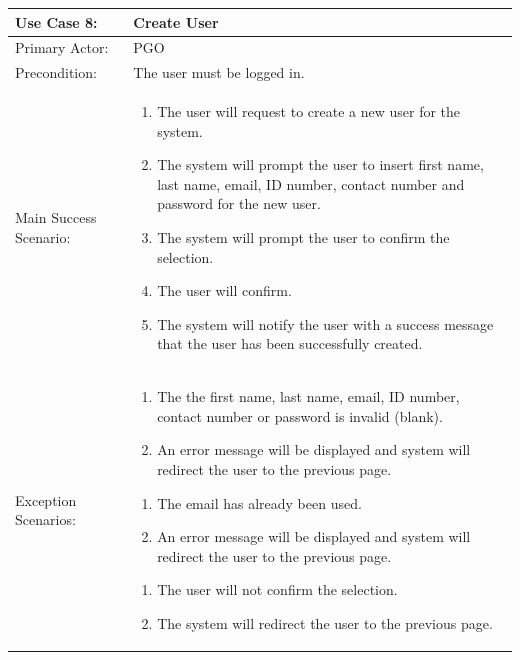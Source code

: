 \documentclass{article}
\begin{document}
\begin{tabular} {| m{5cm} | m{10cm} |}
\hline
Use Case 8: & Create User \\
\hline
Primary Actor: & PGO \\
\hline
Precondition: & The user must be logged in. \\
\hline
Main Success Scenario: & \begin{enumerate} \itemsep0em \item The user will request to create a new user for the system. 
\item The system will prompt the user to insert first name, last name, email, ID number, contact number and password for the new user.
\item The system will prompt the user to confirm the selection.
\item The user will confirm.
\item The system will notify the user with a success message that the user has been successfully created.
\end{enumerate}\\
\hline
Exception Scenarios: & \begin{enumerate} \itemsep0em \item The  the first name, last name, email, ID number, contact number or password is invalid (blank).
\item An error message will be displayed and system will redirect the user to the previous page.
\end{enumerate} \begin{enumerate} \itemsep0em \item The email has already been used.
\item An error message will be displayed and system will redirect the user to the previous page.
\end{enumerate} \begin{enumerate}  \itemsep0em \item The user will not confirm the selection.
\item The system will redirect the user to the previous page. \end{enumerate} \\
\hline
\end{tabular}
\\ \\ \\ \\
\end{document}
